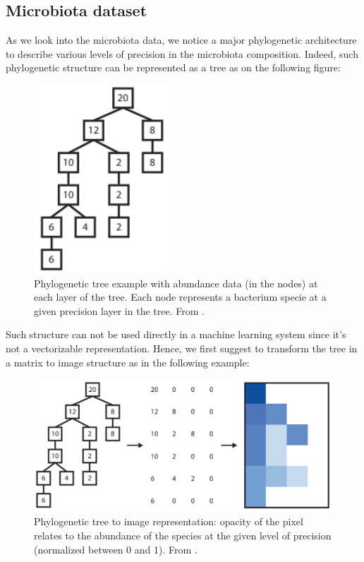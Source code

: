\subsection{Microbiota dataset}

As we look into the microbiota data, we notice a major phylogenetic architecture to describe various levels of precision in the microbiota composition.
Indeed, such phylogenetic structure can be represented as a tree as on the following figure:
\begin{figure}[H]
    \center
    \includegraphics[scale=1]{images/abundance_tree_phylogenetic}
    \caption{Phylogenetic tree example with abundance data (in the nodes) at each layer of the tree.
    Each node represents a bacterium specie at a given precision layer in the tree. From \cite{microbiome_deeplearning_research}.}
    \label{fig:phylogenetic_tree}
\end{figure}

Such structure can not be used directly in a machine learning system since it's not a vectorizable representation.
Hence, we first suggest to transform the tree in a matrix to image structure as in the following example:
\begin{figure}[H]
    \center
    \includegraphics[scale=1]{images/tree_to_image}
    \caption{Phylogenetic tree to image representation:
    opacity of the pixel relates to the abundance of the species at the given level of precision (normalized between 0 and 1).
    From \cite{microbiome_deeplearning_research}.}
    \label{fig:phylogenetic_tree_to_img}
\end{figure}

